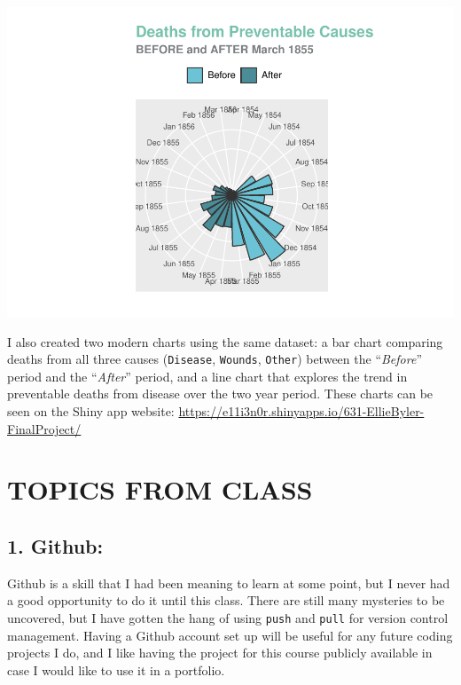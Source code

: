 \documentclass[
  dvipsnames]{article}
\begin{document}
\begin{flushleft}\includegraphics[width=0.9\linewidth]{Byler_Nightingale-Final-Project_Writeup_files/figure-latex/combo rose-1} \end{flushleft}

I also created two modern charts using the same dataset: a bar chart
comparing deaths from all three causes (\texttt{Disease},
\texttt{Wounds}, \texttt{Other}) between the ``\emph{Before}'' period
and the ``\emph{After}'' period, and a line chart that explores the
trend in preventable deaths from disease over the two year period. These
charts can be seen on the Shiny app website:
\url{https://e11i3n0r.shinyapps.io/631-EllieByler-FinalProject/}

\hypertarget{section-8}{%
\section{\texorpdfstring{\textcolor{WildStrawberry}{TOPICS FROM CLASS}}{}}\label{section-8}}

\hypertarget{section-9}{%
\subsection{\texorpdfstring{\textcolor{TealBlue}{1. Github:}}{}}\label{section-9}}

Github is a skill that I had been meaning to learn at some point, but I
never had a good opportunity to do it until this class. There are still
many mysteries to be uncovered, but I have gotten the hang of using
\texttt{push} and \texttt{pull} for version control management. Having a
Github account set up will be useful for any future coding projects I
do, and I like having the project for this course publicly available in
case I would like to use it in a portfolio.
\end{document}
